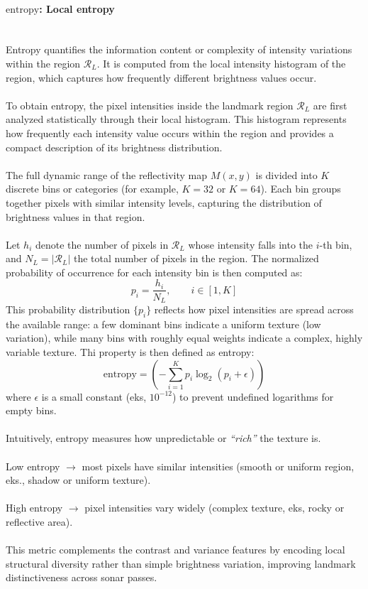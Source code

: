 \paragraph{$\text{entropy}$: Local entropy} \mbox{}\\[0.5em] \noindent
Entropy quantifies the information content or complexity of intensity variations within the region $\mathcal{R}_L$. It is computed from the local intensity histogram of the region, which captures how frequently different brightness values occur.  
\\ \\
To obtain entropy, the pixel intensities inside the landmark region $\mathcal{R}_L$ are first analyzed statistically through their local histogram. This histogram represents how frequently each intensity value occurs within the region and provides a compact description of its brightness distribution.  
\\ \\
The full dynamic range of the reflectivity map $M(x,y)$ is divided into $K$ discrete bins or categories (for example, $K = 32$ or $K = 64$). Each bin groups together pixels with similar intensity levels, capturing the distribution of brightness values in that region.  
\\ \\
Let $h_i$ denote the number of pixels in $\mathcal{R}_L$ whose intensity falls into the $i$-th bin, and $N_L = |\mathcal{R}_L|$ the total number of pixels in the region. The normalized probability of occurrence for each intensity bin is then computed as:
\begin{equation}
    p_i = \frac{h_i}{N_L}, 
    \qquad i \in [1, K]
    \label{eq:local-map-generation-entropy-prob}
\end{equation}
This probability distribution $\{p_i\}$ reflects how pixel intensities are spread across the available range: a few dominant bins indicate a uniform texture (low variation), while many bins with roughly equal weights indicate a complex, highly variable texture. Thi property is then defined as entropy:
\begin{equation}
    \text{entropy} =
    \left(- \sum_{i=1}^{K} p_i \log_2(p_i + \epsilon)\right)
    \label{eq:local-map-generation-entropy}
\end{equation}
where $\epsilon$ is a small constant (eks, $10^{-12}$) to prevent undefined logarithms for empty bins.  
\\ \\
Intuitively, entropy measures how unpredictable or \textit{``rich''} the texture is.
\\ \\
Low entropy $\rightarrow$ most pixels have similar intensities (smooth or uniform region, eks., shadow or uniform texture).
\\ \\  
High entropy $\rightarrow$ pixel intensities vary widely (complex texture, eks, rocky or reflective area).  
\\ \\
This metric complements the contrast and variance features by encoding local structural diversity rather than simple brightness variation, improving landmark distinctiveness across sonar passes.


